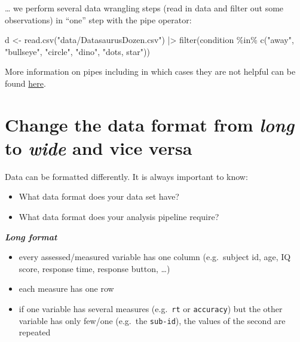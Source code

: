 \documentclass[
  letterpaper,
  DIV=11,
  numbers=noendperiod]{scrreprt}
\newenvironment{Shaded}{\begin{snugshade}}{\end{snugshade}}
\newcommand{\FunctionTok}[1]{\textcolor[rgb]{0.28,0.35,0.67}{#1}}
\newcommand{\NormalTok}[1]{\textcolor[rgb]{0.00,0.23,0.31}{#1}}
\newcommand{\OtherTok}[1]{\textcolor[rgb]{0.00,0.23,0.31}{#1}}
\newcommand{\SpecialCharTok}[1]{\textcolor[rgb]{0.37,0.37,0.37}{#1}}
\newcommand{\StringTok}[1]{\textcolor[rgb]{0.13,0.47,0.30}{#1}}
\begin{document}
\ldots{} we perform several data wrangling steps (read in data and
filter out some observations) in ``one'' step with the pipe operator:

\begin{Shaded}
\begin{Highlighting}[]
\NormalTok{d }\OtherTok{\textless{}{-}} \FunctionTok{read.csv}\NormalTok{(}\StringTok{"data/DatasaurusDozen.csv"}\NormalTok{) }\SpecialCharTok{|\textgreater{}}
    \FunctionTok{filter}\NormalTok{(condition }\SpecialCharTok{\%in\%} \FunctionTok{c}\NormalTok{(}\StringTok{"away"}\NormalTok{, }\StringTok{"bullseye"}\NormalTok{, }\StringTok{"circle"}\NormalTok{, }\StringTok{"dino"}\NormalTok{, }\StringTok{"dots, star"}\NormalTok{))}
\end{Highlighting}
\end{Shaded}

More information on pipes including in which cases they are not helpful
can be found
\href{https://r4ds.had.co.nz/pipes.html\#when-not-to-use-the-pipe}{here}.

\hypertarget{change-the-data-format-from-long-to-wide-and-vice-versa}{%
\section{\texorpdfstring{Change the data format from \emph{long} to
\emph{wide} and vice
versa}{Change the data format from long to wide and vice versa}}\label{change-the-data-format-from-long-to-wide-and-vice-versa}}

Data can be formatted differently. It is always important to know:

\begin{itemize}
\item
  What data format does your data set have?
\item
  What data format does your analysis pipeline require?
\end{itemize}

\textbf{\emph{Long format}}

\begin{itemize}
\item
  every assessed/measured variable has one column (e.g.~subject id, age,
  IQ score, response time, response button, \ldots)
\item
  each measure has one row
\item
  if one variable has several measures (e.g.~\texttt{rt} or
  \texttt{accuracy}) but the other variable has only few/one (e.g.~the
  \texttt{sub-id}), the values of the second are repeated
\end{itemize}
\end{document}
